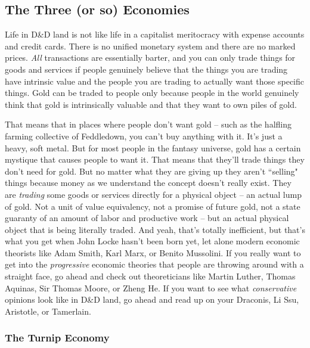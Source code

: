 \subsection{The Three (or so) Economies}
\vspace*{-8pt}

Life in D\&D land is not like life in a capitalist meritocracy with expense accounts and credit cards. There is no unified monetary system and there are no marked prices. \textit{All} transactions are essentially barter, and you can only trade things for goods and services if people genuinely believe that the things you are trading have intrinsic value and the people you are trading to actually want those specific things. Gold can be traded to people only because people in the world genuinely think that gold is intrinsically valuable and that they want to own piles of gold.

That means that in places where people don't want gold -- such as the halfling farming collective of Feddledown, you can't buy anything with it. It's just a heavy, soft metal. But for most people in the fantasy universe, gold has a certain mystique that causes people to want it. That means that they'll trade things they don't need for gold. But no matter what they are giving up they aren't ``selling" things because money as we understand the concept doesn't really exist. They are \textit{trading} some goods or services directly for a physical object -- an actual lump of gold. Not a unit of value equivalency, not a promise of future gold, not a state guaranty of an amount of labor and productive work -- but an actual physical object that is being literally traded. And yeah, that's totally inefficient, but that's what you get when John Locke hasn't been born yet, let alone modern economic theorists like Adam Smith, Karl Marx, or Benito Mussolini. If you really want to get into the \textit{progressive} economic theories that people are throwing around with a straight face, go ahead and check out theoreticians like Martin Luther, Thomas Aquinas, Sir Thomas Moore, or Zheng He. If you want to see what \textit{conservative} opinions look like in D\&D land, go ahead and read up on your Draconis, Li Ssu, Aristotle, or Tamerlain.

\subsubsection{The Turnip Economy}
\vspace*{-8pt}

